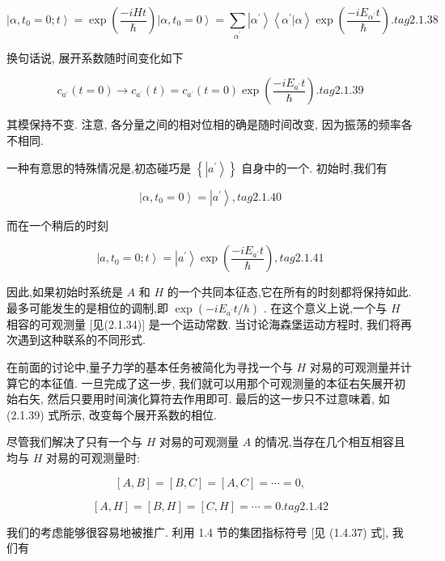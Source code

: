 \documentclass[lang=cn,newtx,10pt,scheme=chinese,thmcnt=section]{elegantbook}
\begin{document}
$$
\left| {\alpha ,{t}_{0} = 0;t}\right\rangle = \exp \left( \frac{-{iHt}}{\hbar }\right) \left| {\alpha ,{t}_{0} = 0}\right\rangle = \mathop{\sum }\limits_{{\alpha }^{\prime }}\left| {\alpha }^{\prime }\right\rangle \left\langle {{\alpha }^{\prime } | \alpha }\right\rangle \exp \left( \frac{-i{E}_{{\alpha }^{\prime }}t}{\hbar }\right) . tag{2. 1.38}
$$

换句话说, 展开系数随时间变化如下

$$
{c}_{{a}^{\prime }}\left( {t = 0}\right) \rightarrow {c}_{{a}^{\prime }}\left( t\right) = {c}_{{a}^{\prime }}\left( {t = 0}\right) \exp \left( \frac{-i{E}_{{a}^{\prime }}t}{\hbar }\right) . tag{2.1.39}
$$

其模保持不变. 注意, 各分量之间的相对位相的确是随时间改变, 因为振荡的频率各不相同.

一种有意思的特殊情况是,初态碰巧是 $\left\{ \left| {a}^{\prime }\right\rangle \right\}$ 自身中的一个. 初始时,我们有

$$
\left| {\alpha ,{t}_{0} = 0}\right\rangle = \left| {a}^{\prime }\right\rangle , tag{2.1.40}
$$

而在一个稍后的时刻

$$
\left| {a,{t}_{0} = 0;t}\right\rangle = \left| {a}^{\prime }\right\rangle \exp \left( \frac{-i{E}_{{a}^{\prime }}t}{\hbar }\right) , tag{2. 1.41}
$$

因此,如果初始时系统是 $A$ 和 $H$ 的一个共同本征态,它在所有的时刻都将保持如此. 最多可能发生的是相位的调制,即 $\exp \left( {-i{E}_{{a}^{\prime }}t/\hbar }\right)$ . 在这个意义上说,一个与 $H$ 相容的可观测量 [见(2.1.34)] 是一个运动常数. 当讨论海森堡运动方程时, 我们将再次遇到这种联系的不同形式.

在前面的讨论中,量子力学的基本任务被简化为寻找一个与 $H$ 对易的可观测量并计算它的本征值. 一旦完成了这一步, 我们就可以用那个可观测量的本征右矢展开初始右矢, 然后只要用时间演化算符去作用即可. 最后的这一步只不过意味着, 如 (2.1.39) 式所示, 改变每个展开系数的相位.

尽管我们解决了只有一个与 $H$ 对易的可观测量 $A$ 的情况,当存在几个相互相容且均与 $H$ 对易的可观测量时:

$$
\left\lbrack {A, B}\right\rbrack = \left\lbrack {B, C}\right\rbrack = \left\lbrack {A, C}\right\rbrack = \cdots = 0,
$$

$$
\left\lbrack {A, H}\right\rbrack = \left\lbrack {B, H}\right\rbrack = \left\lbrack {C, H}\right\rbrack = \cdots = 0. tag{2.1.42}
$$

我们的考虑能够很容易地被推广. 利用 1.4 节的集团指标符号 [见 (1.4.37) 式], 我们有
\end{document}
